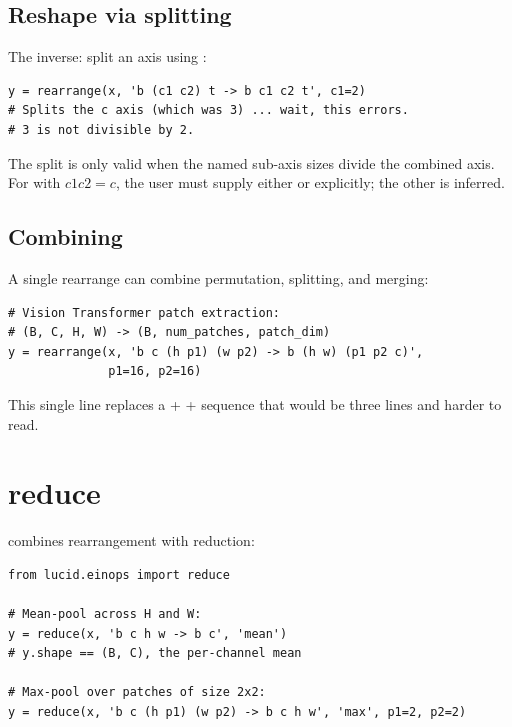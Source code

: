 \subsection{Reshape via splitting}
\label{ssec:einops:reshape_split}

The inverse: split an axis using :

\begin{lstlisting}[style=lucid,language=LucidPython]
y = rearrange(x, 'b (c1 c2) t -> b c1 c2 t', c1=2)
# Splits the c axis (which was 3) ... wait, this errors.
# 3 is not divisible by 2.
\end{lstlisting}

The split is only valid when the named sub-axis sizes divide the
combined axis. For  with $c1 c2 = c$, the user
must supply either  or  explicitly; the other
is inferred.

\subsection{Combining}
\label{ssec:einops:combining}

A single rearrange can combine permutation, splitting, and
merging:

\begin{lstlisting}[style=lucid,language=LucidPython]
# Vision Transformer patch extraction:
# (B, C, H, W) -> (B, num_patches, patch_dim)
y = rearrange(x, 'b c (h p1) (w p2) -> b (h w) (p1 p2 c)',
              p1=16, p2=16)
\end{lstlisting}

This single line replaces a  +  +
 sequence that would be three lines and harder to
read.

\section{reduce}
\label{sec:einops:reduce}

 combines rearrangement with reduction:

\begin{lstlisting}[style=lucid,language=LucidPython]
from lucid.einops import reduce

# Mean-pool across H and W:
y = reduce(x, 'b c h w -> b c', 'mean')
# y.shape == (B, C), the per-channel mean

# Max-pool over patches of size 2x2:
y = reduce(x, 'b c (h p1) (w p2) -> b c h w', 'max', p1=2, p2=2)
\end{lstlisting}

